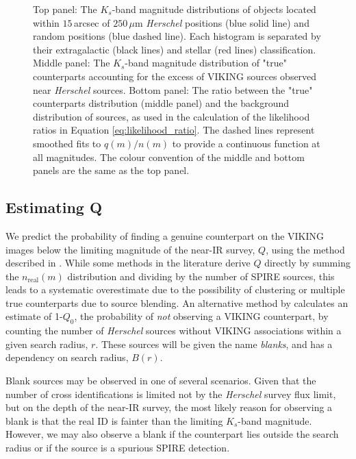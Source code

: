 \begin{figure}
	\caption[$K_s$-band distribution of counterparts, separated into galaxies and stars]{Top panel: The $K_s$-band magnitude distributions of objects located within $15\,$arcsec of $250\,\mu$m \textit{Herschel} positions (blue solid line) and random positions (blue dashed line). Each histogram is separated by their extragalactic (black lines) and stellar (red lines) classification. Middle panel: The $K_s$-band magnitude distribution of "true" counterparts accounting for the excess of VIKING sources observed near \textit{Herschel} sources. Bottom panel: The ratio between the "true" counterparts distribution (middle panel) and the background distribution of sources, as used in the calculation of the likelihood ratios in Equation \ref{eq:likelihood_ratio}. The dashed lines represent smoothed fits to $q(m)/n(m)$ to provide a continuous function at all magnitudes. The colour convention of the middle and bottom panels are the same as the top panel.}
	\label{fig:true_counterparts_distribution}
\end{figure}

\subsection{Estimating Q}
\label{sec:estimating_Q}

We predict the probability of finding a genuine counterpart on the VIKING images below the limiting magnitude of the near-IR survey, $Q$, using the method described in \citealt{Fleuren_2012}. While some methods in the literature derive $Q$ directly by summing the $n_{\textrm{real}}(m)$ distribution and dividing by the number of SPIRE sources, this leads to a systematic overestimate due to the possibility of clustering or multiple true counterparts due to source blending. An alternative method by \citealt{Fleuren_2012} calculates an estimate of 1-$Q_0$, the probability of \textit{not} observing a VIKING counterpart, by counting the number of \textit{Herschel} sources without VIKING associations within a given search radius, $r$. These sources will be given the name \textit{blanks}, and has a dependency on search radius, $B(r)$.

Blank sources may be observed in one of several scenarios. Given that the number of cross identifications is limited not by the \textit{Herschel} survey flux limit, but on the depth of the near-IR survey, the most likely reason for observing a blank is that the real ID is fainter than the limiting $K_s$-band magnitude. However, we may also observe a blank if the counterpart lies outside the search radius or if the source is a spurious SPIRE detection.


